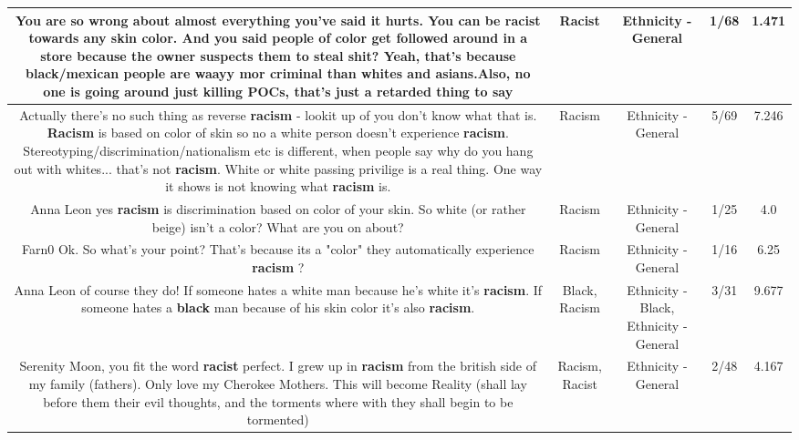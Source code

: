 \documentclass[11pt]{article}
\newlength\mylength
\begin{document}
\begin{center}
\begin{longtable}{|C{.65\mylength}|C{.30\mylength}|C{.12\mylength}|C{.12\mylength}|C{.12\mylength}|}
  \small You are so wrong about almost everything you've said it hurts. You can be \textbf{racist} towards any skin color. And you said people of color get followed around in a store because the owner suspects them to steal shit? Yeah, that's because black/mexican people are waayy mor criminal than whites and asians.Also, no one is going around just killing POCs, that's just a retarded thing to say\normalsize   & Racist & Ethnicity - General & 1/68 & 1.471 \\  \hline
  \small Actually there's no such thing as reverse \textbf{racism} - lookit up of you don't know what that is. \textbf{Racism} is based on color of skin so no a white person doesn't experience \textbf{racism}. Stereotyping/discrimination/nationalism etc is different, when people say why do you hang out with whites... that's not \textbf{racism}. White or white passing privilige is a real thing. One way it shows is not knowing what \textbf{racism} is.\normalsize   & Racism & Ethnicity - General & 5/69 & 7.246 \\  \hline
  \small Anna Leon yes \textbf{racism} is discrimination based on color of your skin. So white (or rather beige) isn't a color? What are you on about?\normalsize   & Racism & Ethnicity - General & 1/25 & 4.0 \\  \hline
  \small Farn0 Ok. So what's your point?  That's because its a "color" they automatically experience \textbf{racism} ?\normalsize   & Racism & Ethnicity - General & 1/16 & 6.25 \\  \hline
  \small Anna Leon of course they do! If someone hates a white man because he's white it's \textbf{racism}. If someone hates a \textbf{black} man because of his skin color it's also \textbf{racism}.\normalsize   & Black, Racism & Ethnicity - Black, Ethnicity - General & 3/31 & 9.677 \\  \hline
  \small Serenity Moon, you fit the word \textbf{racist} perfect.  I grew up in \textbf{racism} from the british side of my family (fathers). Only love my Cherokee Mothers. This will become Reality (shall lay before them their evil thoughts, and the torments where with they shall begin to be tormented)\normalsize   & Racism, Racist & Ethnicity - General & 2/48 & 4.167 \\  \hline

\end{longtable}
\end{center}
\end{document}
